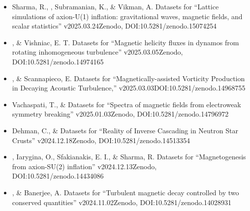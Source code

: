 \begin{itemize}
\item[{56.}~]
Sharma, R., \Brandenburg, Subramanian, K., \& Vikman, A.
{Datasets for ``Lattice simulations of axion-U(1) inflation: gravitational waves, magnetic fields, and scalar statistics'' v2025.03.24}{Zenodo, DOI:10.5281/zenodo.15074254}

\item[{55.}~]
\Brandenburg, \& Vishniac, E. T.
{Datasets for ``Magnetic helicity fluxes in dynamos from rotating inhomogeneous turbulence'' v2025.03.05}{Zenodo, DOI:10.5281/zenodo.14974165}

\item[{54.}~]
\Brandenburg, \& Scannapieco, E.
{Datasets for ``Magnetically-assisted Vorticity Production in Decaying Acoustic Turbulence,'' v2025.03.03}{DOI:10.5281/zenodo.14968755}

\item[{53.}~]
Vachaspati, T., \& \Brandenburg{}
{Datasets for ``Spectra of magnetic fields from electroweak symmetry breaking'' v2025.01.03}{Zenodo, DOI:10.5281/zenodo.14796972}

\item[{52.}~]
Dehman, C., \& \Brandenburg{}
{Datasets for ``Reality of Inverse Cascading in Neutron Star Crusts'' v2024.12.18}{Zenodo, DOI:10.5281/zenodo.14513354}

\item[{51.}~]
\Brandenburg, Iarygina, O., Sfakianakis, E. I., \& Sharma, R.
{Datasets for ``Magnetogenesis from axion-SU(2) inflation'' v2024.12.13}{Zenodo, DOI:10.5281/zenodo.14434086}

\item[{50.}~]
\Brandenburg, \& Banerjee, A.
{Datasets for ``Turbulent magnetic decay controlled by two conserved quantities'' v2024.11.02}{Zenodo, DOI:10.5281/zenodo.14028931}


\end{itemize}

